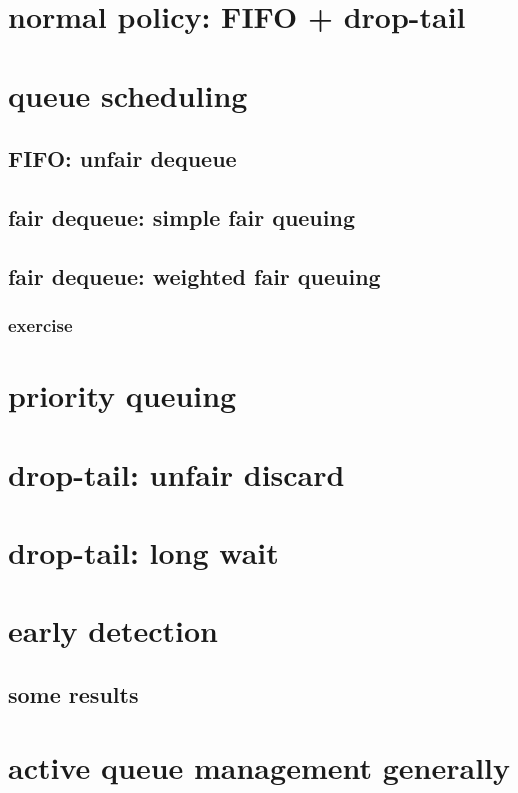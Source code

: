 \section{normal policy: FIFO + drop-tail}


\section{queue scheduling}


\subsection{FIFO: unfair dequeue} 


\subsection{fair dequeue: simple fair queuing}





\subsection{fair dequeue: weighted fair queuing}



\subsubsection{exercise}



\section{priority queuing}


\section{drop-tail: unfair discard}


\section{drop-tail: long wait}


\section{early detection}


\subsection{some results}


\section{active queue management generally}

